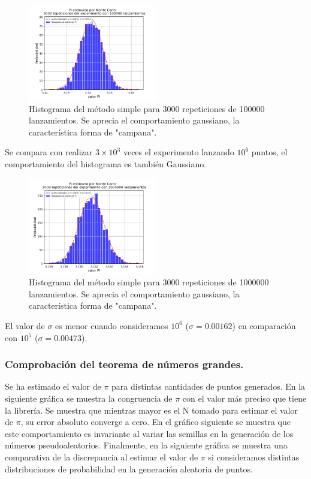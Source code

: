 \documentclass{rbf}
\begin{document}
\begin{figure}[tbp!]
 \centering
  \includegraphics[width=0.5\textwidth]{figures/MCn1e5m3000.png}
	\caption{Histograma del método simple para 3000 repeticiones de 100000 lanzamientos. Se aprecia el comportamiento gaussiano, la característica forma de "campana".}
 \label{buff2}
\end{figure}
Se compara con realizar $3×10^3$ veces el experimento lanzando $10^6$ puntos, el comportamiento del histograma es también Gaussiano.
\begin{figure}[tbp!]
 \centering
  \includegraphics[width=0.5\textwidth]{figures/MCn1e6m3000.png}
	\caption{Histograma del método simple para 3000 repeticiones de 1000000 lanzamientos. Se aprecia el comportamiento gaussiano, la característica forma de "campana".}
 \label{buff3}
\end{figure}

El valor de $\sigma$ es menor cuando consideramos $10^6$ ($\sigma=0.00162$) en comparación con $10^5$ ($\sigma=0.00473$). 
\subsubsection{Comprobación del teorema de números grandes.}
Se ha estimado el valor de $\pi$ para distintas cantidades de puntos generados. En la siguiente gráfica se muestra la congruencia de $\pi$ con el valor más preciso que tiene la librería. Se muestra que mientras mayor es el N tomado para estimar el valor de $\pi$, su error absoluto converge a cero.
En el gráfico siguiente se muestra que este comportamiento es invariante al variar las semillas en la generación de los números pseudoaleatorios.
Finalmente, en la siguiente gráfica se muestra una comparativa de la discrepancia al estimar el valor de $\pi$ si consideramos distintas distribuciones de probabilidad en la generación aleatoria de puntos.
\end{document}
